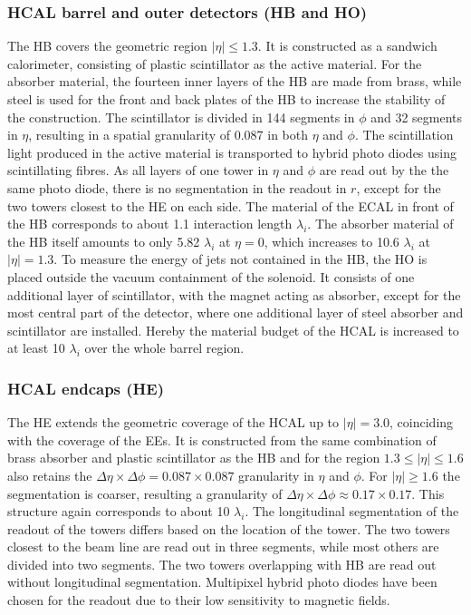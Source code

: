 \subsubsection*{HCAL barrel and outer detectors (HB and HO)}  
The HB covers the geometric region $\vert \eta \vert \leq 1.3$. It is constructed as a sandwich calorimeter, consisting of plastic scintillator as the active material. For the absorber material, the fourteen inner layers of the HB are made from brass, while steel is used for the front and back plates of the HB to increase the stability of the construction. The scintillator is divided in 144 segments in $\phi$ and 32 segments in $\eta$, resulting in a spatial granularity of 0.087 in both $\eta$ and $\phi$. The scintillation light produced in the active material is transported to hybrid photo diodes using scintillating fibres. As all layers of one tower in $\eta$ and $\phi$ are read out by the the same photo diode, there is no segmentation in the readout in $r$, except for the two towers closest to the HE on each side. The material of the ECAL in front of the HB corresponds to about 1.1 interaction length $\lambda_i$. The absorber material of the HB itself amounts to only 5.82 $\lambda_i$ at $\eta = 0$, which increases to 10.6 $\lambda_i$ at $\vert \eta \vert = 1.3$. To measure the energy of jets not contained in the HB, the HO is placed outside the vacuum containment of the solenoid. It consists of one additional layer of scintillator, with the magnet acting as absorber, except for the most central part of the detector, where one additional layer of steel absorber and scintillator are installed. Hereby the material budget of the HCAL is increased to at least 10 $\lambda_i$ over the whole barrel region.

\subsubsection*{HCAL endcaps (HE)}
The HE extends the geometric coverage of the HCAL up to $\vert\eta\vert =3.0$, coinciding with the coverage of the EEs. It is constructed from the same combination of brass absorber and plastic scintillator as the HB and for the region $1.3 \leq \vert\eta\vert \leq 1.6$ also retains the $\Delta\eta \times \Delta \phi = 0.087\times 0.087$ granularity in $\eta$ and $\phi$. For $\vert\eta\vert \geq 1.6$ the segmentation is coarser, resulting a granularity of $\Delta\eta \times \Delta \phi \approx 0.17\times0.17$. This structure again corresponds to about 10 $\lambda_i$. The longitudinal segmentation of the readout of the towers differs based on the location of the tower. The two towers closest to the beam line are read out in three segments, while most others are divided into two segments. The two towers overlapping with HB are read out without longitudinal segmentation. Multipixel hybrid photo diodes have been chosen for the readout due to their low sensitivity to magnetic fields.
